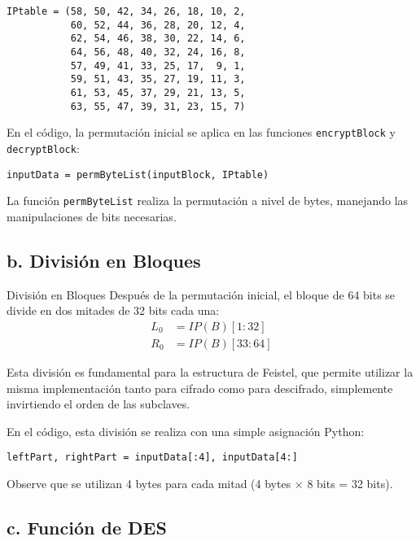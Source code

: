 \begin{lstlisting}[style=cryptoalgo, caption={Tabla de Permutación Inicial}, label=lst:ip]
IPtable = (58, 50, 42, 34, 26, 18, 10, 2,
           60, 52, 44, 36, 28, 20, 12, 4,
           62, 54, 46, 38, 30, 22, 14, 6,
           64, 56, 48, 40, 32, 24, 16, 8,
           57, 49, 41, 33, 25, 17,  9, 1,
           59, 51, 43, 35, 27, 19, 11, 3,
           61, 53, 45, 37, 29, 21, 13, 5,
           63, 55, 47, 39, 31, 23, 15, 7)
\end{lstlisting}

En el código, la permutación inicial se aplica en las funciones \texttt{encryptBlock} y \texttt{decryptBlock}:

\begin{lstlisting}[style=cryptoalgo]
inputData = permByteList(inputBlock, IPtable)
\end{lstlisting}

La función \texttt{permByteList} realiza la permutación a nivel de bytes, manejando las manipulaciones de bits necesarias.

\subsection{b. División en Bloques}

\begin{cryptomethod}{División en Bloques}
Después de la permutación inicial, el bloque de 64 bits se divide en dos mitades de 32 bits cada una:
\begin{align}
L_0 &= IP(B)[1:32] \\
R_0 &= IP(B)[33:64]
\end{align}

Esta división es fundamental para la estructura de Feistel, que permite utilizar la misma implementación tanto para cifrado como para descifrado, simplemente invirtiendo el orden de las subclaves.
\end{cryptomethod}

En el código, esta división se realiza con una simple asignación Python:

\begin{lstlisting}[style=cryptoalgo]
leftPart, rightPart = inputData[:4], inputData[4:]
\end{lstlisting}

Observe que se utilizan 4 bytes para cada mitad (4 bytes × 8 bits = 32 bits).

\subsection{c. Función de DES}

